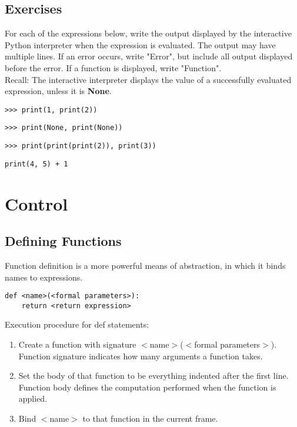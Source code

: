 \documentclass[11pt]{article}
\begin{document}
\subsection{Exercises}
For each of the expressions below, write the output displayed by the interactive Python interpreter when the expression is evaluated. The output may have multiple lines. If an error occurs, write "Error", but include all output displayed before the error. If a function is displayed, write "Function". \\
Recall: The interactive interpreter displays the value of a successfully evaluated expression, unless it is \textbf{None}. 
\begin{lstlisting}
>>> print(1, print(2))
\end{lstlisting}
\begin{lstlisting}
>>> print(None, print(None))
\end{lstlisting}
\begin{lstlisting}
>>> print(print(print(2)), print(3))
\end{lstlisting}
\begin{lstlisting}
print(4, 5) + 1
\end{lstlisting}



\newpage
\section{Control}
\subsection{Defining Functions} 
Function definition is a more powerful means of abstraction, in which it binds names to expressions. 
\begin{lstlisting}
def <name>(<formal parameters>):
	return <return expression>
\end{lstlisting} 
Execution procedure for def statements: 
\begin{enumerate}
\item Create a function with signature $<$name$>$($<$formal parameters$>$). Function signature indicates how many arguments a function takes. 
\item Set the body of that function to be everything indented after the first line. Function body defines the computation performed when the function is applied. 
\item Bind $<$name$>$ to that function in the current frame. 
\end{enumerate} 
\end{document}
